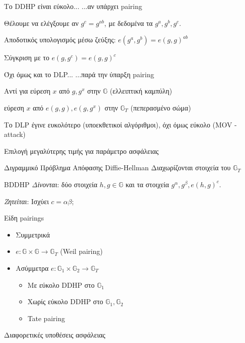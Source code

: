 \documentclass[handout]{beamer}
\begin{document}
\begin{frame}{Το DDHP είναι εύκολο...}
...\alert{αν υπάρχει pairing} \pause

Θέλουμε να ελέγξουμε αν $g^c = g^{ab}$, με δεδομένα τα $g^a,g^b, g^c$. \pause

Αποδοτικός υπολογισμός μέσω ζεύξης: $e(g^a, g^b) = e(g,g)^{ab}$ \pause

Σύγκριση με το $e(g,g^c)=e(g,g)^c$ 
\end{frame}

\begin{frame}{{Όχι όμως και το DLP...}}
...\alert{παρά την ύπαρξη pairing} \pause

Αντί για εύρεση $x$ από $g,g^x$ στην $\mathbb{G}$ (ελλειπτική καμπύλη)  \pause

εύρεση $x$ από $e(g,g),e(g,g^x)$ στην $\mathbb{G}_T$ (πεπερασμένο σώμα)  \pause

Το DLP έγινε ευκολότερο (υποεκθετικοί αλγόριθμοι), όχι όμως εύκολο (MOV - attack) \pause

Επιλογή μεγαλύτερης τιμής για παράμετρο ασφάλειας 
\end{frame}

\begin{frame}{Διγραμμικό Πρόβλημα Απόφασης Diffie-Hellman}
	Διαχωρίζονται στοιχεία του $\mathbb{G}_T$
	\begin{block}{BDDHP}
		\emph{Δίνονται}: δύο στοιχεία $h,g \in \mathbb{G}$ και τα στοιχεία $g^\alpha, g^\beta,  e(h,g)^c$.

		\pause
		\emph{Ζητείται}: Ισχύει $c = \alpha \beta$;
	\end{block} 
\end{frame}

\begin{frame}{Είδη pairings}
	\begin{itemize}
		\item Συμμετρικά 
		
		\item $e : \mathbb{G} \times \mathbb{G} \rightarrow \mathbb{G}_T$ (Weil pairing) \pause
		
		\item Ασύμμετρα 		
		$e : \mathbb{G}_1 \times \mathbb{G}_2 \rightarrow \mathbb{G}_T$ \pause
		\begin{itemize}
			\item Με εύκολο DDHP στο $\mathbb{G}_1$
			\item Χωρίς εύκολο DDHP στο $\mathbb{G}_1,\mathbb{G}_2$
			\item Tate pairing
		\end{itemize}
	\end{itemize}
	Διαφορετικές υποθέσεις ασφάλειας
\end{frame}
\end{document}
